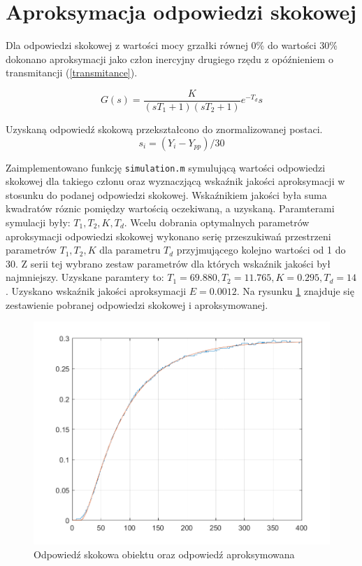 \section{Aproksymacja odpowiedzi skokowej}

Dla odpowiedzi skokowej z wartości mocy grzałki równej 0\% do wartości 30\% dokonano aproksymacji jako człon inercyjny drugiego rzędu z
opóźnieniem o transmitancji  (\ref{transmitance}).

\begin{equation}
   G(s) = \frac{K}{(sT_1 + 1)(sT_2 + 1)}e^{- T_d} s
   \label{transmitance}
\end{equation}

Uzyskaną odpowiedź skokową przekształcono do znormalizowanej postaci.
\begin{equation}
    s_i = (Y_i - Y_{pp})/30
\end{equation}

Zaimplementowano funkcję \texttt{simulation.m} symulującą wartości odpowiedzi skokowej dla takiego członu oraz wyznaczjącą wskaźnik jakości aproksymacji w stosunku do podanej odpowiedzi skokowej. Wskaźnikiem jakości była suma kwadratów róznic pomiędzy wartością oczekiwaną, a uzyskaną. Paramterami symulacji były: $T_1, T_2, K, T_d$.
Wcelu dobrania optymalnych parametrów aproksymacji odpowiedzi skokowej wykonano serię przeszukiwań przestrzeni parametrów $T_1, T_2, K$ dla parametru $T_d$ przyjmującego kolejno wartości od 1 do 30. Z serii tej wybrano zestaw parametrów dla których wskaźnik jakości był najmniejszy.
Uzyskane paramtery to: $T_1 = \num{69.880}, T_2 = \num{11.765}, K = \num{0.295}, T_d = 14$. Uzyskano wskaźnik jakości aproksymacji $E = \num{0.0012}$. Na rysunku \ref{aprox} znajduje się zestawienie pobranej odpowiedzi skokowej i aproksymowanej.

\begin{figure}
\label{aprox}
\centering
\caption{Odpowiedź skokowa obiektu oraz odpowiedź aproksymowana}
\includegraphics{aproximation.png}
\end{figure}